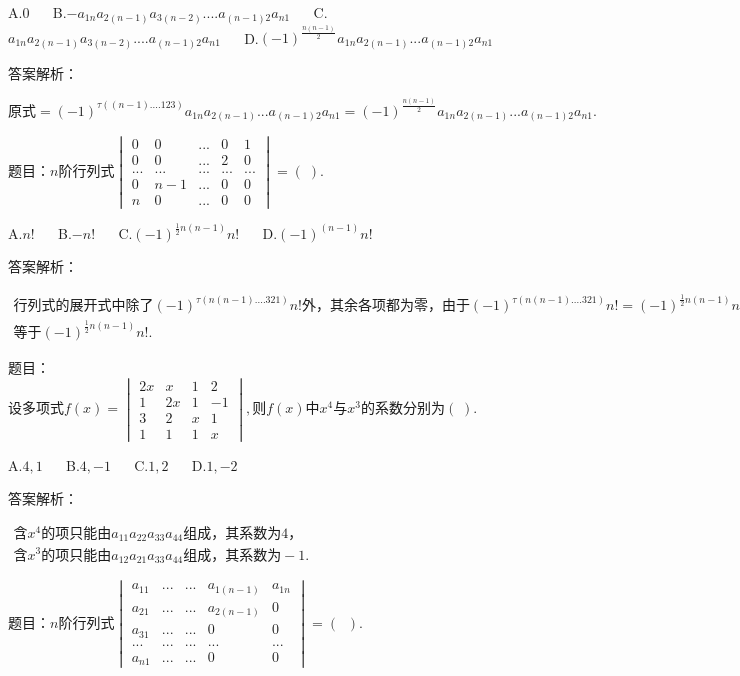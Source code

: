 A.$0$ $\quad$ B.$-a_{1n}a_{2(n-1)}a_{3(n-2)}....a_{(n-1)2}a_{n1}$ $\quad$ C.$a_{1n}a_{2(n-1)}a_{3(n-2)}....a_{(n-1)2}a_{n1}$ $\quad$ D.$(-1)^{\textstyle\frac{n(n-1)}2}{\textstyle{}^{}}a_{1n}a_{2(n-1)}...a_{(n-1)2}a_{n1}$

答案解析：

$\mathrm{原式}=(-1)^{\tau((n-1)....123)}a_{1n}a_{2(n-1)}...a_{(n-1)2}a_{n1}=(-1)^\frac{n(n-1)}2a_{1n}a_{2(n-1)}...a_{(n-1)2}a_{n1}.$



题目：$n\mathrm{阶行列式}\begin{vmatrix}0&0&...&0&1\\0&0&...&2&0\\...&...&...&...&...\\0&n-1&...&0&0\\n&0&...&0&0\end{vmatrix}=(\;).$

A.$n!$ $\quad$ B.$-n!$ $\quad$ C.$(-1)^{{\textstyle\frac12}n(n-1)}n!$ $\quad$ D.$(-1)^{\textstyle(n-1)}n!$

答案解析：

$\begin{array}{l}\mathrm{行列式的展开式中除了}(-1)^{\textstyle\tau(n(n-1)....321)}n!外，\mathrm{其余各项都为零}，\mathrm{由于}(-1)^{\textstyle\tau(n(n-1)....321)}n!=(-1)^{{\textstyle\frac12}n(n-1)}n!,\mathrm{故原行列式}\\\mathrm{等于}(-1)^{\textstyle\frac12n(n-1)}n!.\end{array}$



题目：$\mathrm{设多项式}f(x)=\begin{vmatrix}2x&x&1&2\\1&2x&1&-1\\3&2&x&1\\1&1&1&x\end{vmatrix},则f(x)中x^4与x^3\mathrm{的系数分别为}(\;).$

A.$4,1$ $\quad$ B.$4,-1$ $\quad$ C.$1,2$ $\quad$ D.$1,-2$

答案解析：

$\begin{array}{l}含x^4\mathrm{的项只能由}a_{11}a_{22}a_{33}a_{44}\mathrm{组成}，\mathrm{其系数为}4，\\含x^3\mathrm{的项只能由}a_{12}a_{21}a_{33}a_{44}\mathrm{组成}，\mathrm{其系数为}-1.\end{array}$



题目：$n\mathrm{阶行列式}\begin{vmatrix}a_{11}&...&...&a_{1(n-1)}&a_{1n}\\a_{21}&...&...&a_{2(n-1)}&0\\a_{31}&...&...&0&0\\...&...&...&...&...\\a_{n1}&...&...&0&0\end{vmatrix}=(\;\;).$

